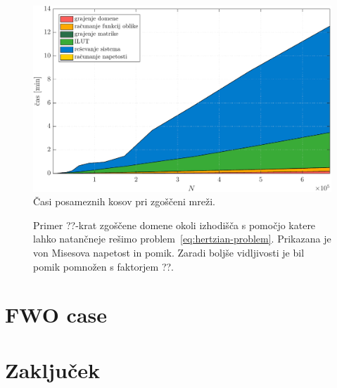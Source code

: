 \documentclass[12pt,a4paper,twoside]{article}
\theoremstyle{definition} %
\theoremstyle{plain} %
\numberwithin{equation}{section}
\newlength{\iw}
\begin{document}
\begin{figure}[h]
  \centering
  \includegraphics[width=\iw]{images/hertzian_refined_time.pdf}
  \caption{Časi posameznih kosov pri zgoščeni mreži.}
  \label{fig:hertz-refined-time}
\end{figure}

\begin{figure}[h]
  \centering
  \caption{Primer ??-krat zgoščene domene okoli izhodišča s pomočjo katere lahko natančneje rešimo
  problem~\eqref{eq:hertzian-problem}. Prikazana je von Misesova napetost in pomik. Zaradi boljše
vidljivosti je bil pomik pomnožen s faktorjem ??.}
  \label{fig:hertz-refined-domain}
\end{figure}


\section{FWO case}

\section{Zaključek}

\cleardoublepage
{}


\end{document}
